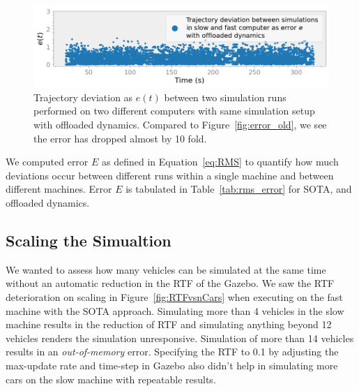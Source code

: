 \documentclass[aps,pra,twocolumn,notitlepage,nofootinbib,superscriptaddress]{revtex4-1}
\begin{document}
\begin{figure}[h]
    \centering
    \includegraphics[clip,width=1.0\linewidth]{error_new.png}
    \caption{Trajectory deviation as $e(t)$ between two simulation runs performed on two different computers with same simulation setup with offloaded dynamics. Compared to Figure~\ref{fig:error_old}, we see the error has dropped almost by 10 fold.}
    \label{fig:error_new}
\end{figure}

We computed error $E$ as defined in Equation~\eqref{eq:RMS} to quantify how much deviations occur between different runs within a single machine and between different machines. Error $E$ is tabulated in Table~\ref{tab:rms_error} for SOTA, and offloaded dynamics.





\subsection{Scaling the Simualtion}
We wanted to assess how many vehicles can be simulated at the same time without an automatic reduction in the RTF of the Gazebo. 
We saw the RTF deterioration on scaling in Figure~\ref{fig:RTFvsnCars} when executing on the fast machine with the SOTA approach. Simulating more than 4 vehicles in the slow machine results in the reduction of RTF and simulating anything beyond 12 vehicles renders the simulation unresponsive. Simulation of more than 14 vehicles results in an \textit{out-of-memory} error. Specifying the RTF to 0.1 by adjusting the max-update rate and time-step in Gazebo also didn't help in simulating more cars on the slow machine with repeatable results.
\end{document}

